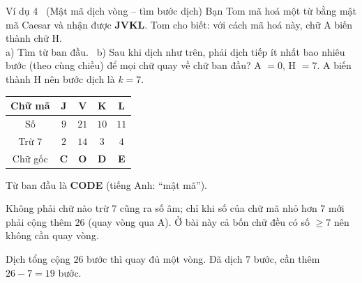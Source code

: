 \begin{exbox}{Ví dụ 4 \ (Mật mã dịch vòng -- tìm bước dịch)}
Bạn Tom mã hoá một từ bằng mật mã Caesar và nhận được \textbf{JVKL}. Tom cho biết: với cách mã hoá này, chữ A biến thành chữ H.\\
a) Tìm từ ban đầu. \ b) Sau khi dịch như trên, phải dịch tiếp ít nhất bao nhiêu bước (theo cùng chiều) để mọi chữ quay về chữ ban đầu?
\guide
{}
A $= 0$, H $= 7$. A biến thành H nên bước dịch là $k = 7$.
\begin{center}
\begin{tabular}{|c|c|c|c|c|}
\hline
\rowcolor{tmBlue!10} Chữ mã & J & V & K & L \\ \hline
Số & $9$ & $21$ & $10$ & $11$ \\ \hline
Trừ $7$ & $2$ & $14$ & $3$ & $4$ \\ \hline
Chữ gốc & \textbf{C} & \textbf{O} & \textbf{D} & \textbf{E} \\ \hline
\end{tabular}
\end{center}
Từ ban đầu là \textbf{CODE} (tiếng Anh: ``mật mã'').
\begin{warnbox}Không phải chữ nào trừ $7$ cũng ra số âm; chỉ khi số của chữ mã nhỏ hơn $7$ mới phải cộng thêm $26$ (quay vòng qua A).
Ở bài này cả bốn chữ đều có số $\ge 7$ nên không cần quay vòng.\end{warnbox}
Dịch tổng cộng $26$ bước thì quay đủ một vòng. Đã dịch $7$ bước, cần thêm $26 - 7 = 19$ bước.
\end{exbox}

